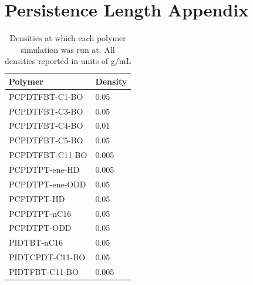 \chapter{Persistence Length Appendix}
\label{app:pers_len}

\begin{table}[ht]
    \centering
    \begin{tabular}{ll}

    \textbf{Polymer}  &     \textbf{Density} \\
    \hline
    PCPDTFBT-C1-BO    &     0.05    \\
    PCPDTFBT-C3-BO    &     0.05    \\
    PCPDTFBT-C4-BO    &     0.01    \\
    PCPDTFBT-C5-BO    &     0.05    \\
    PCPDTFBT-C11-BO   &     0.005   \\ 
    PCPDTPT-ene-HD    &     0.005   \\
    PCPDTPT-ene-ODD   &     0.05    \\
    PCPDTPT-HD        &     0.05    \\
    PCPDTPT-nC16      &     0.05    \\
    PCPDTPT-ODD       &     0.05    \\
    PIDTBT-nC16       &     0.05    \\
    PIDTCPDT-C11-BO   &     0.05    \\
    PIDTFBT-C11-BO    &     0.005   \\
    \end{tabular}
    \caption{Densities at which each polymer simulation was run at. All densities reported in units of g/mL}
    \label{densities}
\end{table}

